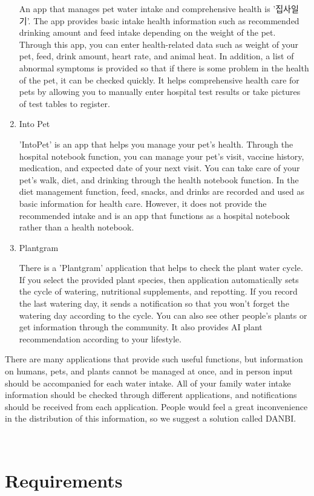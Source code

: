 \documentclass[conference]{IEEEtran}
\begin{document}
\begin{enumerate}
An app that manages pet water intake and comprehensive health is '집사일기'. The app provides basic intake health information such as recommended drinking amount and feed intake depending on the weight of the pet. Through this app, you can enter health-related data such as weight of your pet, feed, drink amount, heart rate, and animal heat. In addition, a list of abnormal symptoms is provided so that if there is some problem in the health of the pet, it can be checked quickly. It helps comprehensive health care for pets by allowing you to manually enter hospital test results or take pictures of test tables to register.
\item Into Pet 

'IntoPet' is an app that helps you manage your pet's health. Through the hospital notebook function, you can manage your pet's visit, vaccine history, medication, and expected date of your next visit. You can take care of your pet's walk, diet, and drinking through the health notebook function. In the diet management function, feed, snacks, and drinks are recorded and used as basic information for health care. However, it does not provide the recommended intake and is an app that functions as a hospital notebook rather than a health notebook.
\item Plantgram 

There is a 'Plantgram' application that helps to check the plant water cycle. If you select the provided plant species, then application automatically sets the cycle of watering, nutritional supplements, and repotting. If you record the last watering day, it sends a notification so that you won't forget the watering day according to the cycle. You can also see other people's plants or get information through the community. It also provides AI plant recommendation according to your lifestyle.
\end{enumerate}
There are many applications that provide such useful functions, but information on humans, pets, and plants cannot be managed at once, and in person input should be accompanied for each water intake. All of your family water intake information should be checked through different applications, and notifications should be received from each application. People would feel a great inconvenience in the distribution of this information, so we suggest a solution called DANBI.

\ 

\section{Requirements}
\end{document}
